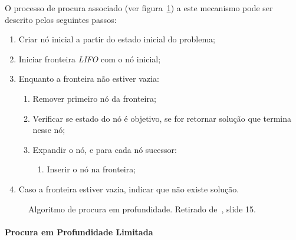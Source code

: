 O processo de procura associado (ver figura~\ref{fig:alg-proc-profundidade}) a este mecanismo pode ser descrito pelos seguintes passos:

\begin{enumerate}
    \item Criar nó inicial a partir do estado inicial do problema;
    \item Iniciar fronteira \textit{LIFO} com o nó inicial;
    \item Enquanto a fronteira não estiver vazia:
    \begin{enumerate}
        \item Remover primeiro nó da fronteira;
        \item Verificar se estado do nó é objetivo, se for retornar solução que termina nesse nó;
        \item Expandir o nó, e para cada nó sucessor:
        \begin{enumerate}
            \item Inserir o nó na fronteira;
        \end{enumerate}
    \end{enumerate}
    \item Caso a fronteira estiver vazia, indicar que não existe solução.
\end{enumerate}

\begin{figure}[H]
    \begin{center}
    \end{center}
    \caption{Algoritmo de procura em profundidade. Retirado de~\cite{isel:iasa:slides:proc-espaco-estados-parte-1}, slide 15.}
    \label{fig:alg-proc-profundidade}
\end{figure}

\paragraph{Procura em Profundidade Limitada}\label{par:procura-profundidade-limitada}


